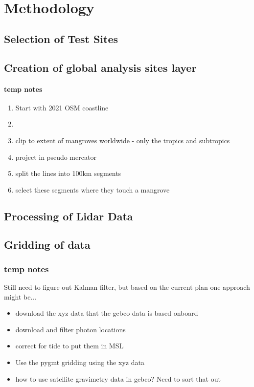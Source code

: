 \chapter{Methodology}
\section{Selection of Test Sites}
\section{Creation of global analysis sites layer}
\subsubsection*{temp notes}
\begin{enumerate}
    \color{orange}
    \item Start with 2021 OSM coastline
    \item 
    \item clip to extent of mangroves worldwide - only the tropics and subtropics
    \item project in pseudo mercator
    \item split the lines into 100km segments
    \item select these segments where they touch a mangrove 
\end{enumerate}


\section{Processing of Lidar Data}

\section{Gridding of data}
\subsection{temp notes}
Still need to figure out Kalman filter, but based on the current plan one approach might be...
\begin{itemize}
    \color{orange}
    \item download the xyz data that the gebco data is based onboard
    \item download and filter photon locations
    \item correct for tide to put them in MSL
    \item Use the pygmt gridding using the xyz data
    \item how to use satellite gravimetry data in gebco? Need to sort that out
\end{itemize}